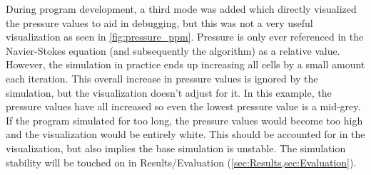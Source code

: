 \label{sec:VizPressureCritique}
During program development, a third mode was added which directly visualized the pressure values to aid in debugging, but this was not a very useful visualization as seen in \cref{fig:pressure_ppm}.
Pressure is only ever referenced in the Navier-Stokes equation (and subsequently the algorithm) as a relative value.
However, the simulation in practice ends up increasing all cells by a small amount each iteration.
This overall increase in pressure values is ignored by the simulation, but the visualization doesn't adjust for it.
In this example, the pressure values have all increased so even the lowest pressure value is a mid-grey.
If the program simulated for too long, the pressure values would become too high and the visualization would be entirely white.
This should be accounted for in the visualization, but also implies the base simulation is unstable.
The simulation stability will be touched on in Results/Evaluation (\cref{sec:Results,sec:Evaluation}).